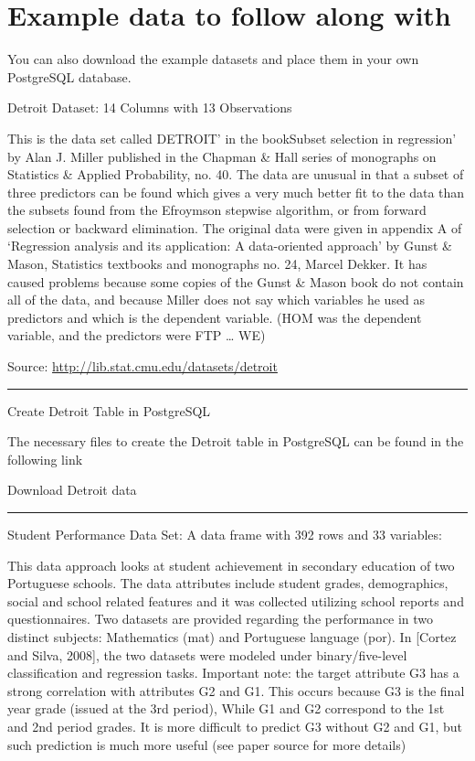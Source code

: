 \documentclass[]{book}
\begin{document}
\chapter{Example data to follow along
with}\label{example-data-to-follow-along-with}

You can also download the example datasets and place them in your own
PostgreSQL database.

Detroit Dataset: 14 Columns with 13 Observations

This is the data set called DETROIT' in the bookSubset selection in
regression' by Alan J. Miller published in the Chapman \& Hall series of
monographs on Statistics \& Applied Probability, no. 40. The data are
unusual in that a subset of three predictors can be found which gives a
very much better fit to the data than the subsets found from the
Efroymson stepwise algorithm, or from forward selection or backward
elimination. The original data were given in appendix A of `Regression
analysis and its application: A data-oriented approach' by Gunst \&
Mason, Statistics textbooks and monographs no. 24, Marcel Dekker. It has
caused problems because some copies of the Gunst \& Mason book do not
contain all of the data, and because Miller does not say which variables
he used as predictors and which is the dependent variable. (HOM was the
dependent variable, and the predictors were FTP \ldots{} WE)

Source: \url{http://lib.stat.cmu.edu/datasets/detroit}

\begin{center}\rule{0.5\linewidth}{\linethickness}\end{center}

Create Detroit Table in PostgreSQL

The necessary files to create the Detroit table in PostgreSQL can be
found in the following link

Download Detroit data

\begin{center}\rule{0.5\linewidth}{\linethickness}\end{center}

Student Performance Data Set: A data frame with 392 rows and 33
variables:

This data approach looks at student achievement in secondary education
of two Portuguese schools. The data attributes include student grades,
demographics, social and school related features and it was collected
utilizing school reports and questionnaires. Two datasets are provided
regarding the performance in two distinct subjects: Mathematics (mat)
and Portuguese language (por). In {[}Cortez and Silva, 2008{]}, the two
datasets were modeled under binary/five-level classification and
regression tasks. Important note: the target attribute G3 has a strong
correlation with attributes G2 and G1. This occurs because G3 is the
final year grade (issued at the 3rd period), While G1 and G2 correspond
to the 1st and 2nd period grades. It is more difficult to predict G3
without G2 and G1, but such prediction is much more useful (see paper
source for more details)
\end{document}
